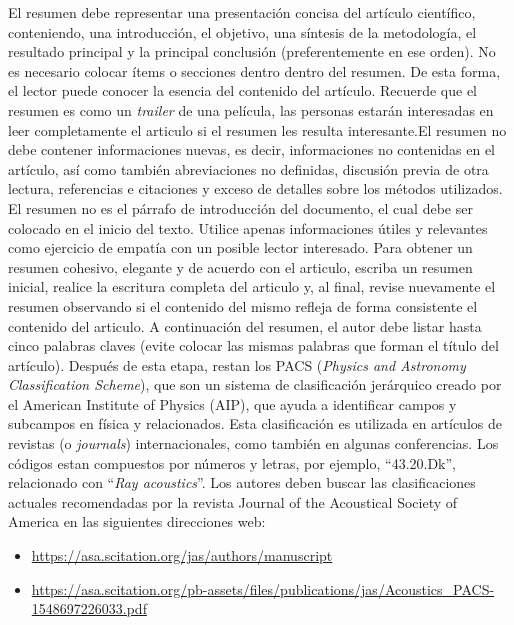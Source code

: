 \documentclass[12pt, a4paper, twoside, twocolumn]{article}
\begin{document}
El resumen debe representar una presentación concisa del artículo científico, conteniendo, una introducción, el objetivo, una síntesis de la metodología, el resultado principal y la principal conclusión (preferentemente en ese orden). No es necesario colocar ítems o secciones dentro dentro del resumen. De esta forma, el lector puede conocer la esencia del contenido del artículo. Recuerde que el resumen es como un \textit{trailer} de una película, las personas estarán interesadas en leer completamente el articulo si el resumen les resulta interesante.El resumen no debe contener informaciones nuevas, es decir, informaciones no contenidas en el artículo, así como también abreviaciones no definidas, discusión previa de otra lectura, referencias e citaciones y exceso de detalles sobre los métodos utilizados. El resumen no es el párrafo de introducción del documento, el cual debe ser colocado en el inicio del texto. Utilice apenas informaciones útiles y relevantes como ejercicio de empatía con un posible lector interesado. Para obtener un resumen cohesivo, elegante y de acuerdo con el articulo, escriba un resumen inicial, realice la escritura completa del articulo y, al final, revise nuevamente el resumen observando si el contenido del mismo refleja de forma consistente el contenido del articulo. 
A continuación del resumen, el autor debe listar hasta cinco palabras claves (evite colocar las mismas palabras que forman el título del artículo). Después de esta etapa, restan los PACS (\textit{Physics and Astronomy Classification Scheme}), que son un sistema de clasificación jerárquico creado por el  American Institute of Physics (AIP), que ayuda a identificar campos y subcampos en física y relacionados. Esta clasificación es utilizada en artículos de revistas (o \textit{journals}) internacionales, como también en algunas conferencias. Los códigos estan compuestos por números y letras, por ejemplo, ``43.20.Dk'', relacionado con ``\textit{Ray acoustics}''. Los autores deben buscar las clasificaciones actuales recomendadas por la revista Journal of the Acoustical Society of America en las siguientes direcciones web:

\begin{itemize}[noitemsep,topsep=-1ex] \itemsep=8pt
	\item \url{https://asa.scitation.org/jas/authors/manuscript}
	\item \url{https://asa.scitation.org/pb-assets/files/publications/jas/Acoustics_PACS-1548697226033.pdf}
\end{itemize}
%
\end{document}
